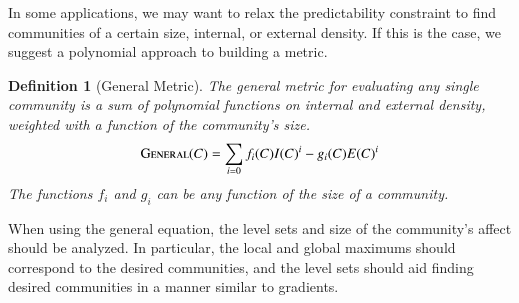 \documentclass[phd,tocprelim]{cornell}
\newtheorem{definition}{Definition}
\begin{document}
In some applications, we may want to relax the predictability constraint to find communities of a certain size, internal, or external density.  If this is the case, we suggest a polynomial approach to building a metric.
\begin{definition}[General Metric] The general metric for evaluating any single community is a sum of polynomial functions on internal and external density, weighted with a function of the community's size.
  \begin{equation}
   \mbox{\sc General}(C) = \sum\limits_{i = 0} f_i(C) I(C)^i - g_i(C) E(C)^i
  \end{equation}
The functions $f_i$ and $g_i$ can be any function of the size of a community.
\end{definition}
When using the general equation, the level sets and size of the community's affect should be analyzed.  In particular, the local and global maximums should correspond to the desired communities, and the level sets should aid finding desired communities in a manner similar to gradients.
\end{document}

